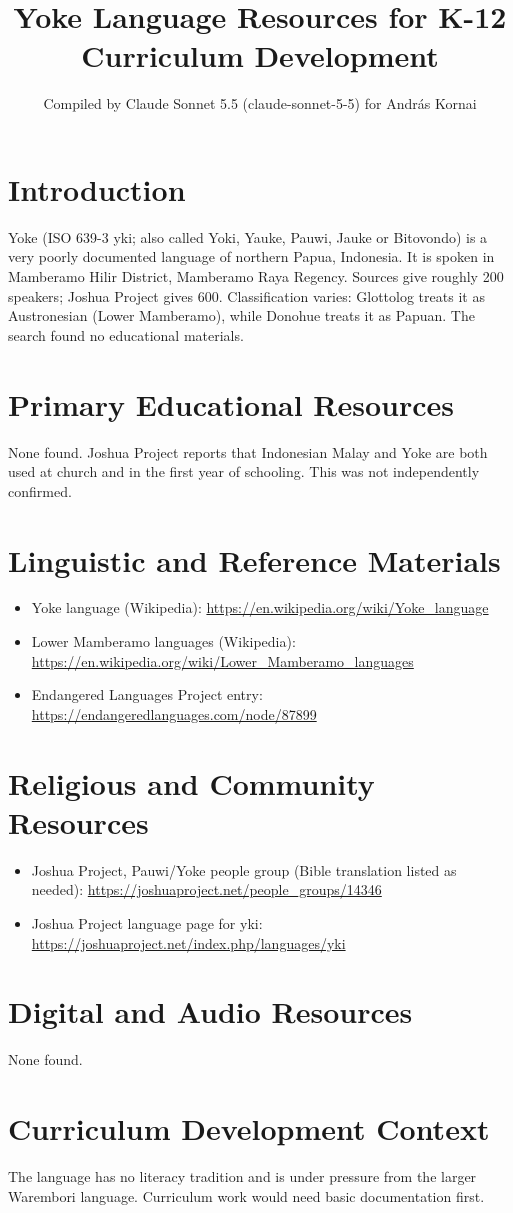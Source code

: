 \documentclass[12pt]{article}
\title{Yoke Language Resources for K-12 Curriculum Development}
\author{Compiled by Claude Sonnet 5.5 (claude-sonnet-5-5) for Andr\'as Kornai}
\date{}
\begin{document}
\maketitle

\section{Introduction}
Yoke (ISO 639-3 yki; also called Yoki, Yauke, Pauwi, Jauke or Bitovondo) is a very poorly documented language of northern Papua, Indonesia. It is spoken in Mamberamo Hilir District, Mamberamo Raya Regency. Sources give roughly 200 speakers; Joshua Project gives 600. Classification varies: Glottolog treats it as Austronesian (Lower Mamberamo), while Donohue treats it as Papuan. The search found no educational materials.

\section{Primary Educational Resources}
None found. Joshua Project reports that Indonesian Malay and Yoke are both used at church and in the first year of schooling. This was not independently confirmed.

\section{Linguistic and Reference Materials}
\begin{itemize}
\item Yoke language (Wikipedia): \url{https://en.wikipedia.org/wiki/Yoke_language}
\item Lower Mamberamo languages (Wikipedia): \url{https://en.wikipedia.org/wiki/Lower_Mamberamo_languages}
\item Endangered Languages Project entry: \url{https://endangeredlanguages.com/node/87899}
\end{itemize}

\section{Religious and Community Resources}
\begin{itemize}
\item Joshua Project, Pauwi/Yoke people group (Bible translation listed as needed): \url{https://joshuaproject.net/people_groups/14346}
\item Joshua Project language page for yki: \url{https://joshuaproject.net/index.php/languages/yki}
\end{itemize}

\section{Digital and Audio Resources}
None found.

\section{Curriculum Development Context}
The language has no literacy tradition and is under pressure from the larger Warembori language. Curriculum work would need basic documentation first.
\end{document}
